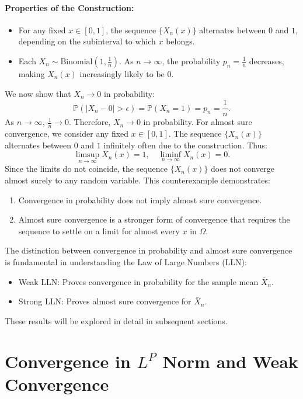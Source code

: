 \paragraph{Properties of the Construction:}
\begin{itemize}
    \item For any fixed \( x \in [0, 1] \), the sequence \( \{X_n(x)\} \) alternates between \( 0 \) and \( 1 \), depending on the subinterval to which \( x \) belongs.
    \item Each \( X_n \sim \text{Binomial}(1, \frac{1}{n}) \). As \( n \to \infty \), the probability \( p_n = \frac{1}{n} \) decreases, making \( X_n(x) \) increasingly likely to be \( 0 \).
\end{itemize}
We now show that \( X_n \to 0 \) in probability:
\[
\mathbb{P}(|X_n - 0| > \epsilon) = \mathbb{P}(X_n = 1) = p_n = \frac{1}{n}.
\]
As \( n \to \infty \), \( \frac{1}{n} \to 0 \). Therefore, \( X_n \to 0 \) in probability. \newline
For almost sure convergence, we consider any fixed \( x \in [0, 1] \). The sequence \( \{X_n(x)\} \) alternates between \( 0 \) and \( 1 \) infinitely often due to the construction. Thus:
\[
\limsup_{n \to \infty} X_n(x) = 1, \quad \liminf_{n \to \infty} X_n(x) = 0.
\]
Since the limits do not coincide, the sequence \( \{X_n(x)\} \) does not converge almost surely to any random variable. \newline
This counterexample demonstrates:
\begin{enumerate}
    \item Convergence in probability does not imply almost sure convergence.
    \item Almost sure convergence is a stronger form of convergence that requires the sequence to settle on a limit for almost every \( x \) in \( \Omega \).
\end{enumerate}
The distinction between convergence in probability and almost sure convergence is fundamental in understanding the Law of Large Numbers (LLN):
\begin{itemize}
    \item Weak LLN: Proves convergence in probability for the sample mean \( \bar{X}_n \).
    \item Strong LLN: Proves almost sure convergence for \( \bar{X}_n \).
\end{itemize}
These results will be explored in detail in subsequent sections.


\section{Convergence in $L^P$ Norm and Weak Convergence}

